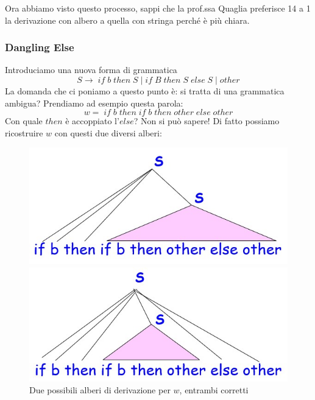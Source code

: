 \documentclass[class=book, crop=false, oneside, 12pt]{standalone}
\begin{document}
Ora abbiamo visto questo processo, sappi che la prof.ssa Quaglia preferisce 14 a 1 la derivazione con albero a quella con stringa perché è più chiara.

\subsubsection*{Dangling Else}
Introduciamo una nuova forma di grammatica
\begin{equation}
    S \to \; if \; b \; then \; S \mid if\; B\; then\; S\; else\; S \mid other
\end{equation}
La domanda che ci poniamo a questo punto è: si tratta di una grammatica ambigua? Prendiamo ad esempio questa parola:
\begin{equation}
    \label{dangling_else}
    w =\; if\; b\; then\; if\; b\; then\; other\; else\; other
\end{equation}
Con quale \(then\) è accoppiato l’\(else\)? Non si può sapere! Di fatto possiamo ricostruire \(w\) con questi due diversi alberi:
\begin{figure}[H]
    \begin{minipage}{.5\textwidth}
        \centering
        \includegraphics[width=.9\textwidth,keepaspectratio]{dangling_else_1.jpg}
	\end{minipage}
	\begin{minipage}{.5\textwidth}
        \centering
        \includegraphics[width=.9\textwidth,keepaspectratio]{dangling_else_2.jpg}
    \end{minipage}
    \caption{Due possibili alberi di derivazione per \(w\), entrambi corretti}
    \label{fig:dangling_else}
\end{figure}
\end{document}

